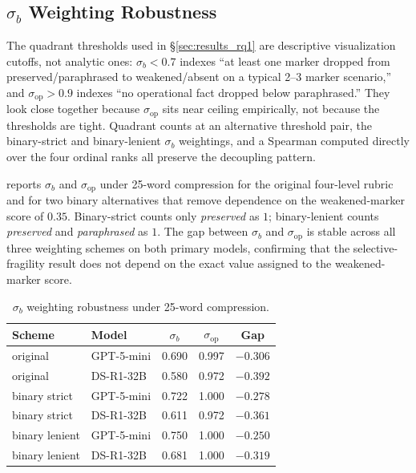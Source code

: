 \subsection{$\sigma_b$ Weighting Robustness}
\label{app:sigma_weighting}
The quadrant thresholds used in \S\ref{sec:results_rq1} are descriptive visualization cutoffs, not analytic ones: $\sigma_b < 0.7$ indexes ``at least one marker dropped from preserved/paraphrased to weakened/absent on a typical 2--3 marker scenario,'' and $\sigma_{\mathrm{op}} > 0.9$ indexes ``no operational fact dropped below paraphrased.'' They look close together because $\sigma_{\mathrm{op}}$ sits near ceiling empirically, not because the thresholds are tight. Quadrant counts at an alternative threshold pair, the binary-strict and binary-lenient $\sigma_b$ weightings, and a Spearman computed directly over the four ordinal ranks all preserve the decoupling pattern.

 reports $\sigma_b$ and $\sigma_{\mathrm{op}}$ under 25-word compression for the original four-level rubric and for two binary alternatives that remove dependence on the weakened-marker score of $0.35$. Binary-strict counts only \emph{preserved} as $1$; binary-lenient counts \emph{preserved} and \emph{paraphrased} as $1$. The gap between $\sigma_b$ and $\sigma_{\mathrm{op}}$ is stable across all three weighting schemes on both primary models, confirming that the selective-fragility result does not depend on the exact value assigned to the weakened-marker score.

\begin{table}[ht]
\centering
\small
\setlength{\tabcolsep}{3pt}
\begin{tabular}{@{}llccc@{}}
\toprule
\textbf{Scheme} & \textbf{Model} & $\sigma_b$ & $\sigma_{\mathrm{op}}$ & \textbf{Gap} \\
\midrule
original       & GPT-5-mini & 0.690 & 0.997 & $-0.306$ \\
original       & DS-R1-32B  & 0.580 & 0.972 & $-0.392$ \\
binary strict  & GPT-5-mini & 0.722 & 1.000 & $-0.278$ \\
binary strict  & DS-R1-32B  & 0.611 & 0.972 & $-0.361$ \\
binary lenient & GPT-5-mini & 0.750 & 1.000 & $-0.250$ \\
binary lenient & DS-R1-32B  & 0.681 & 1.000 & $-0.319$ \\
\bottomrule
\end{tabular}
\caption{$\sigma_b$ weighting robustness under 25-word compression.}
\label{tab:sigma_weighting}
\end{table}

